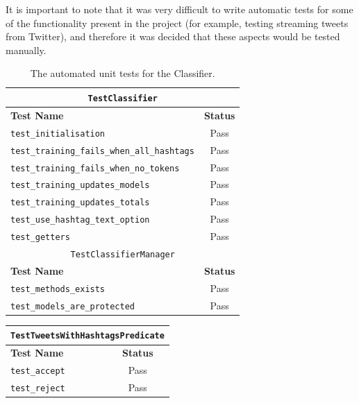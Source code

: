 \documentclass[11pt,a4paper]{report}
\begin{document}
\begin{subappendices}
It is important to note that it was very difficult to write automatic tests for some of the functionality present in the project (for example, testing streaming tweets from Twitter), and therefore it was decided that these aspects would be tested manually.
\begin{table}[htpb]
    \centering
    \begin{tabular}{|l|c|}
        \hline
        \multicolumn{2}{|c|}{\texttt{TestClassifier}} \\
        \hline
        \textbf{Test Name} & \textbf{Status} \\
        \hline
        \verb+test_initialisation+ & \cellcolor{green!25}Pass \\
        \verb+test_training_fails_when_all_hashtags+ & \cellcolor{green!25}Pass \\
        \verb+test_training_fails_when_no_tokens+ & \cellcolor{green!25}Pass \\
        \verb+test_training_updates_models+ & \cellcolor{green!25}Pass \\
        \verb+test_training_updates_totals+ & \cellcolor{green!25}Pass \\
        \verb+test_use_hashtag_text_option+ & \cellcolor{green!25}Pass \\
        \verb+test_getters+ & \cellcolor{green!25}Pass \\
        \hline
        \multicolumn{2}{|c|}{\texttt{TestClassifierManager}} \\
        \hline
        \textbf{Test Name} & \textbf{Status} \\
        \hline
        \verb+test_methods_exists+ & \cellcolor{green!25}Pass \\
        \verb+test_models_are_protected+ & \cellcolor{green!25}Pass \\
        \hline
    \end{tabular}
    \caption*{The automated unit tests for the Classifier.}
\end{table}
\begin{table}[htpb]
    \centering
    \begin{tabular}{|l|c|}
        \hline
        \multicolumn{2}{|c|}{\texttt{TestTweetsWithHashtagsPredicate}} \\
        \hline
        \textbf{Test Name} & \textbf{Status} \\
        \hline
        \verb+test_accept+ & \cellcolor{green!25}Pass \\
        \verb+test_reject+ & \cellcolor{green!25}Pass \\

\end{tabular}
\end{table}
\end{subappendices}
\end{document}
